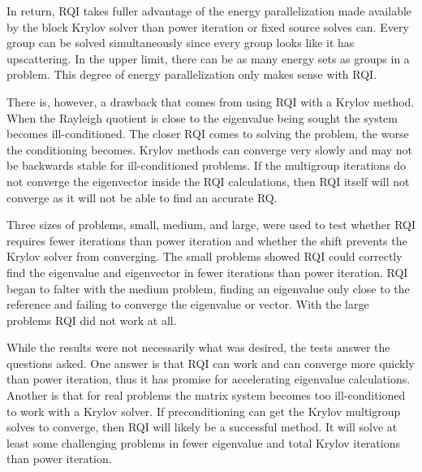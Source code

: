 In return, RQI takes fuller advantage of the energy parallelization made available by the block Krylov solver than power iteration or fixed source solves can. Every group can be solved simultaneously since every group looks like it has upscattering. In the upper limit, there can be as many energy sets as groups in a problem. This degree of energy parallelization only makes sense with RQI. 

There is, however, a drawback that comes from using RQI with a Krylov method. When the Rayleigh quotient is close to the eigenvalue being sought the system becomes ill-conditioned. The closer RQI comes to solving the problem, the worse the conditioning becomes. Krylov methods can converge very slowly and may not be backwards stable for ill-conditioned problems. If the multigroup iterations do not converge the eigenvector inside the RQI calculations, then RQI itself will not converge as it will not be able to find an accurate RQ.

Three sizes of problems, small, medium, and large, were used to test whether RQI requires fewer iterations than power iteration and whether the shift prevents the Krylov solver from converging. The small problems showed RQI could correctly find the eigenvalue and eigenvector in fewer iterations than power iteration. RQI began to falter with the medium problem, finding an eigenvalue only close to the reference and failing to converge the eigenvalue or vector. With the large problems RQI did not work at all.



While the results were not necessarily what was desired, the tests answer the questions asked. One answer is that RQI can work and can converge more quickly than power iteration, thus it has promise for accelerating eigenvalue calculations. Another is that for real problems the matrix system becomes too ill-conditioned to work with a Krylov solver. If preconditioning can get the Krylov multigroup solves to converge, then RQI will likely be a successful method. It will solve at least some challenging problems in fewer eigenvalue and total Krylov iterations than power iteration. 


